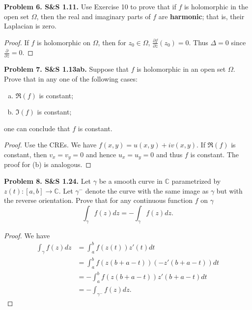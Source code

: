 \documentclass[leqno]{article}
\theoremstyle{nonumberplain}
\newtheorem{proof}{Proof}
\newcommand{\C}{\mathbb{C}}
\begin{document}
\noindent\textbf{Problem 6. S\&S 1.11.} Use Exercise 10 to prove that if $f$ is holomorphic in the open set $\Omega$, then the real and imaginary parts of $f$ are \textbf{harmonic}; that is, their Laplacian is zero.


\begin{proof}
If $f$ is holomorphic on $\Omega$, then for $z_0\in \Omega$, $\frac{\partial f}{\partial \overline{z}} (z_0)=0$. Thus $\Delta =0$ since $\frac{\partial}{\partial \overline{z}} =0$.
\end{proof}

\vspace*{1cm}

\noindent\textbf{Problem 7. S\&S 1.13ab.} Suppose that $f$ is holomorphic in an open set $\Omega$. Prove that in any one of the following cases:
\begin{enumerate}[(a)]
\item $\Re(f)$ is constant;
\item $\Im(f)$ is constant;
\end{enumerate}
one can conclude that $f$ is constant.

\begin{proof}
Use the CREs.  We have $f(x,y)=u(x,y)+iv(x,y)$.  If $\Re(f)$ is constant, then $v_x=v_y=0$ and hence $u_x=u_y=0$ and thus $f$ is constant. The proof for (b) is analogous.
\end{proof}


\vspace*{1cm}

\noindent\textbf{Problem 8. S\&S 1.24.} Let $\gamma$ be a smooth curve in $\C$ parametrized by $z(t)\colon [a,b] \to \C$. Let $\gamma^-$ denote the curve with the same image as $\gamma$ but with the reverse orientation. Prove that for any continuous function $f$ on $\gamma$
\[
\int_\gamma f(z) dz = -\int_\gamma f(z)dz.
\]


\begin{proof}
We have
\begin{align*}
\int_\gamma f(z)dz &= \int_a^b f(z(t))z'(t)dt\\
&= \int_{a}^{b} f(z(b+a-t))(-z'(b+a-t))dt\\
&= -\int_{a}^{b} f(z(b+a-t))z'(b+a-t)dt\\
&= -\int_{\gamma^-} f(z)dz.
\end{align*}
\end{proof}
\end{document}
